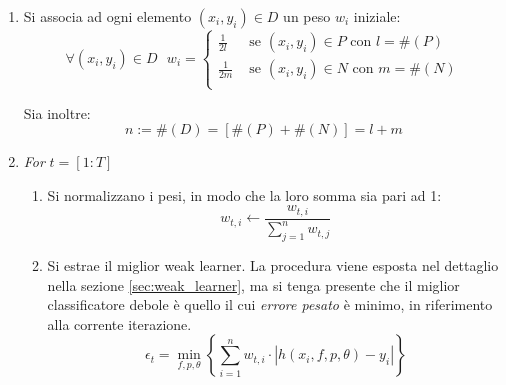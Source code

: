             \begin{enumerate}
                \item Si associa ad ogni elemento $(x_i, y_i) \in D$ un peso $w_i$ iniziale:
                \begin{equation}
                    \label{subeq:weighting_samples}
                    \forall (x_i, y_i) \in D \text{  }
                    w_i = 
                    \begin{cases}
                        \frac{1}{2l} & \text{ se } (x_i, y_i) \in P \text{ con } l = \#(P) \\
                        \frac{1}{2m} & \text{ se } (x_i, y_i) \in N \text{ con } m = \#(N) \\
                    \end{cases}
                \end{equation}

                Sia inoltre:
                \begin{equation}
                    \label{subeq:definition_of_n}
                    n := \#(D) = \left[\#(P) + \#(N) \right] = l + m
                \end{equation}

                \item \emph{For} $t = [1:T]$
                \begin{enumerate}
                    \item Si normalizzano i pesi, in modo che la loro somma sia pari ad 1:
                    \begin{equation}
                        \label{subeq:weight_nomalization}
                        w_{t,i} \leftarrow \frac{w_{t,i}}{\sum_{j = 1}^{n}w_{t,j}}
                    \end{equation}

                    \item \label{adaboost_minimum_error}
                    Si estrae il miglior weak learner. 
                    La procedura viene esposta nel dettaglio nella sezione \ref{sec:weak_learner}, ma si tenga presente che il miglior classificatore debole è quello il cui \emph{errore pesato} è minimo, in riferimento alla corrente iterazione.
                    \begin{equation}
                        \label{subeq:minimum_error}
                        \epsilon_t = \min_{f,p,\theta} \left\{
                        \sum_{i = 1}^{n} w_{t,i} \cdot |h(x_i, f, p, \theta) - y_i|
                        \right\} 
                    \end{equation}
                    

\end{enumerate}
\end{enumerate}

